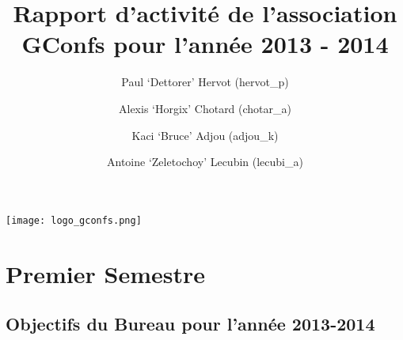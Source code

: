 \documentclass[12pt]{report}
\title{Rapport d'activité de l'association GConfs pour l'année 2013 - 2014}
\author{Paul `Dettorer' Hervot (hervot\_p)
        \and Alexis `Horgix' Chotard (chotar\_a)
        \and Kaci `Bruce' Adjou (adjou\_k)
        \and Antoine `Zeletochoy' Lecubin (lecubi\_a)}
\begin{document}
  \begin{titlepage}
    \begin{center}
      \texttt{[image: logo\_gconfs.png]} \\
    \end{center}
    {\let\newpage\relax\maketitle}
  \end{titlepage}
  \tableofcontents
  \chapter{Premier Semestre}
  \section{Objectifs du Bureau pour l'année 2013-2014}
\end{document}
